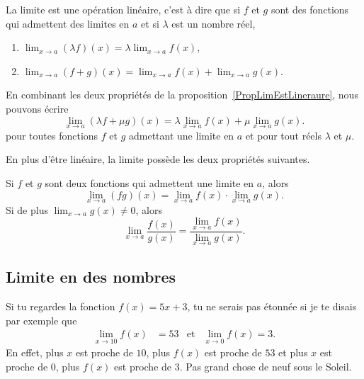 \begin{proposition}	\label{PropLimEstLineraure}
	La limite est une opération linéaire, c'est à dire que si $f$ et $g$ sont des fonctions qui admettent des limites en $a$ et si $\lambda$ est un nombre réel,
	\begin{enumerate}

		\item
			$\lim_{x\to a} (\lambda f)(x)=\lambda\lim_{x\to a} f(x)$,
		\item
			$\lim_{x\to a} (f+g)(x)=\lim_{x\to a} f(x)+\lim_{x\to a} g(x)$.
	\end{enumerate}
\end{proposition}
En combinant les deux propriétés de la proposition~\ref{PropLimEstLineraure}, nous pouvons écrire
\begin{equation}
	\lim_{x\to a} (\lambda f+\mu g)(x)=\lambda\lim_{x\to a} f(x)+\mu\lim_{x\to a} g(x).
\end{equation}
pour toutes fonctions $f$ et $g$ admettant une limite en $a$ et pour tout réels $\lambda$ et $\mu$.

En plus d'être linéaire, la limite possède les deux propriétés suivantes.
\begin{proposition}
	Si $f$ et $g$ sont deux fonctions qui admettent une limite en $a$, alors
	\begin{equation}
		\lim_{x\to a} (fg)(x)=\lim_{x\to a} f(x)\cdot\lim_{x\to a} g(x).
	\end{equation}
	Si de plus $\lim_{x\to a} g(x)\neq 0$, alors
	\begin{equation}
		\lim_{x\to a} \frac{ f(x) }{ g(x) }=\frac{ \lim_{x\to a} f(x) }{ \lim_{x\to a} g(x) }.
	\end{equation}
\end{proposition}

\subsection{Limite en des nombres}

Si tu regardes la fonction $f(x)=5x+3$, tu ne serais pas étonnée si je te disais par exemple que
\begin{align}
\lim_{x\to 10}f(x)&=53&\text{et}&\lim_{x\to 0}f(x)=3.
\end{align}
En effet, plus $x$ est proche de $10$, plus $f(x)$ est proche de $53$ et plus $x$ est proche de $0$, plus $f(x)$ est proche de $3$. Pas grand chose de neuf sous le Soleil.

